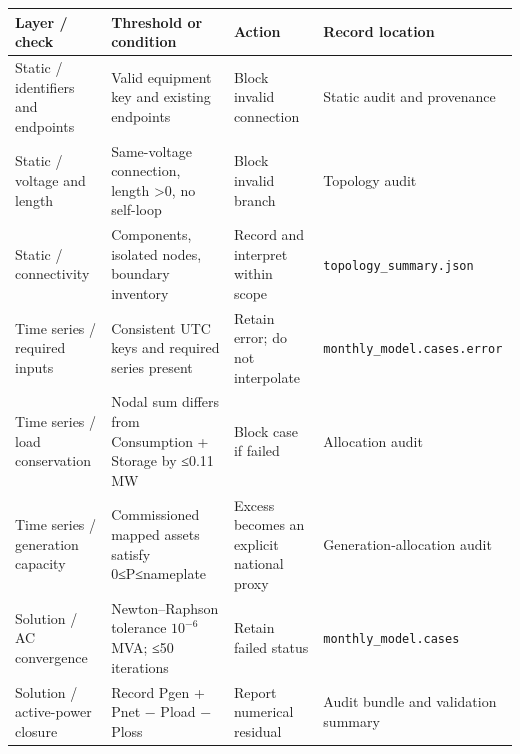 \documentclass[
  10pt]{article}
\begin{document}
\begin{longtable}[]{@{}
  >{\raggedright\arraybackslash}p{}
  >{\raggedright\arraybackslash}p{}
  >{\raggedright\arraybackslash}p{}
  >{\raggedright\arraybackslash}p{}@{}}
\toprule\noalign{}
\begin{minipage}[b]{\linewidth}\raggedright
Layer / check
\end{minipage} & \begin{minipage}[b]{\linewidth}\raggedright
Threshold or condition
\end{minipage} & \begin{minipage}[b]{\linewidth}\raggedright
Action
\end{minipage} & \begin{minipage}[b]{\linewidth}\raggedright
Record location
\end{minipage} \\
\midrule\noalign{}
\endhead
\bottomrule\noalign{}
\endlastfoot
Static / identifiers and endpoints & Valid equipment key and existing
endpoints & Block invalid connection & Static audit and provenance \\
Static / voltage and length & Same-voltage connection, length
\textgreater0, no self-loop & Block invalid branch & Topology audit \\
Static / connectivity & Components, isolated nodes, boundary inventory &
Record and interpret within scope & \texttt{topology\_summary.json} \\
Time series / required inputs & Consistent UTC keys and required series
present & Retain error; do not interpolate &
\texttt{monthly\_model.cases.error} \\
Time series / load conservation & Nodal sum differs from Consumption +
Storage by ≤0.11 MW & Block case if failed & Allocation audit \\
Time series / generation capacity & Commissioned mapped assets satisfy
0≤P≤nameplate & Excess becomes an explicit national proxy &
Generation-allocation audit \\
Solution / AC convergence & Newton--Raphson tolerance \(10^{-6}\) MVA;
≤50 iterations & Retain failed status & \texttt{monthly\_model.cases} \\
Solution / active-power closure & Record Pgen + Pnet − Pload − Ploss &
Report numerical residual & Audit bundle and validation summary \\

\end{longtable}
\end{document}
